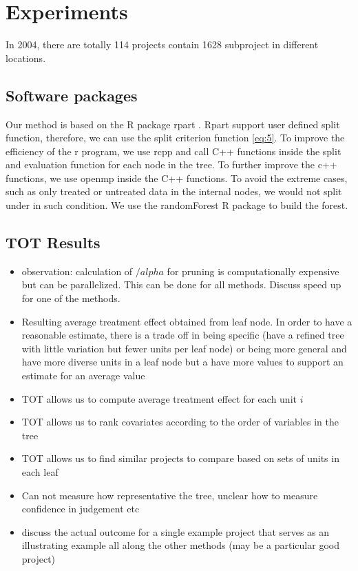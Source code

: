 \section{Experiments}
In 2004, there are totally 114 projects contain 1628 subproject in different locations. 
\subsection{Software packages}
Our method is based on the R package rpart \cite{cart}. Rpart support user defined split function, therefore, we can use the split criterion function \ref{eq:5}. To improve the efficiency of the r program, we use rcpp and call C++ functions inside the split and evaluation function for each node in the tree. To further improve the c++ functions, we use openmp inside the C++ functions. To avoid the extreme cases, such as only treated or untreated data in the internal nodes, we would not split under in such condition. We use the randomForest \cite{rf} R package to build the forest.

\subsection{TOT Results}
\begin{itemize}
\item observation: calculation of $/alpha$ for pruning is computationally expensive but can be parallelized. This can be done for all methods. Discuss speed up for one of the methods.
\item Resulting average treatment effect obtained from leaf node. In order to have a reasonable estimate, there is a trade off in being specific (have a refined tree with little variation but fewer units per leaf node) or being more general and have more diverse units in a leaf node but a have more values to support an estimate for an average value
\item TOT allows us to compute average treatment effect for each unit $i$
\item TOT allows us to rank covariates according to the order of variables in the tree
\item TOT allows us to find similar projects to compare based on sets of units in each leaf
\item Can not measure how representative the tree, unclear how to measure confidence in judgement etc
\item discuss the actual outcome for a single example project that serves as an illustrating example all along the other methods (may be a particular good project)
\end{itemize}

